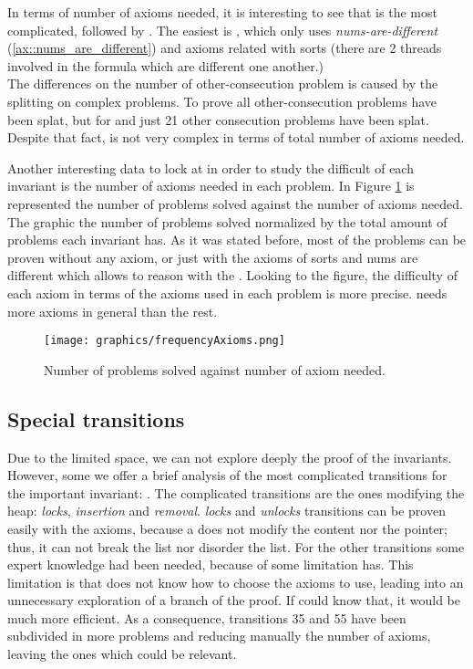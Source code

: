 In terms of number of axioms needed, it is interesting to see that \invLock is the most complicated, followed by \invNext.  
%
The easiest is \invDisjoint, which only uses \textit{nums-are-different} (\ref{ax::nums_are_different}) and axioms related with sorts (there are 2 threads involved in the formula which are different one another.)
\\
The differences on the number of other-consecution problem is caused by the splitting on complex \spass problems. 
%
To prove \invOrder all other-consecution problems have been splat, but for \invLock and \invNext just 21 other consecution problems have been splat.
%
Despite that fact, \invOrder is not very complex in terms of total number of axioms needed.

Another interesting data to lock at in order to study the difficult of each invariant is the number of axioms needed in each problem. 
%
In Figure \ref{fig:frequencyAxioms} is represented the number of problems solved against the number of axioms needed.
%
The graphic the number of problems solved normalized by the total amount of problems each invariant has.
%
As it was stated before, most of the problems can be proven without any axiom, or just with the axioms of sorts and nums are different which allows to reason with the \pc.
%
Looking to the figure, the difficulty of each axiom in terms of the axioms used in each problem is more precise. 
%
\invOrder needs more axioms in general than the rest.


\begin{figure}[hbtp]
\centering
\texttt{[image: graphics/frequencyAxioms.png]}
\caption{Number of problems solved against number of axiom needed.}
\label{fig:frequencyAxioms}
\end{figure}

\subsection{Special transitions}

Due to the limited space, we can not explore deeply the proof of the invariants.
%
However, some we offer a brief analysis of the most complicated transitions for the important invariant: \invPreserve. The complicated transitions are the ones modifying the heap: \textit{locks}, \textit{insertion} and \textit{removal}. 
%
\textit{locks} and \textit{unlocks} transitions can be proven easily with the axioms, because a \fLock does not modify the content nor the pointer; thus, it can not break the list nor disorder the list.
%
For the other transitions some expert knowledge had been needed, because of some limitation \spass has.
%
This limitation is that \spass does not know how to choose the axioms to use, leading into an unnecessary exploration of a branch of the proof. 
%
\label{infty:time}
If \spass could know that, it would be much more efficient. 
%
As a consequence, transitions 35 and 55 have been subdivided in more \spass problems and reducing manually the number of axioms, leaving the ones which could be relevant.
%

